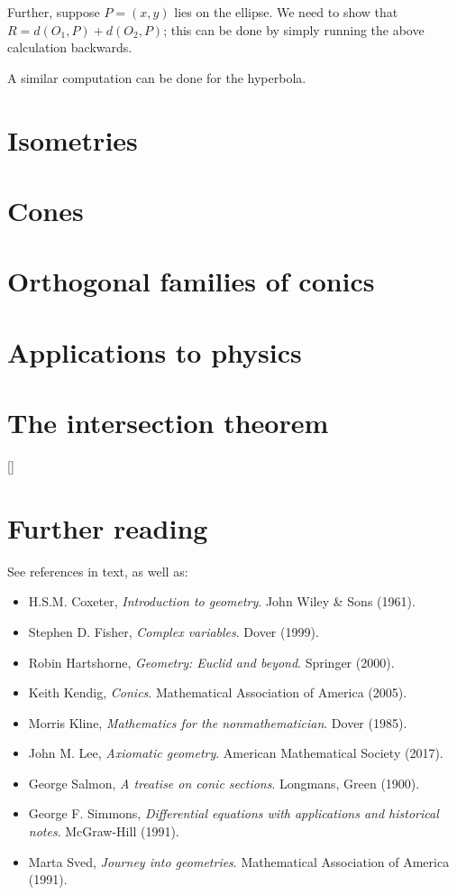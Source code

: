 \documentclass[a4paper,leqno,10pt]{article}
\theoremstyle{exercise}
\theoremstyle{plain}
\theoremstyle{definition}
\theoremstyle{remark}
\begin{document}
Further, suppose $ P = (x,y) $ lies on the ellipse. We need to show that $ R = d(O_1, P) + d(O_2, P) $; this can be done by simply running
the above calculation backwards.

A similar computation can be done for the hyperbola.

\section{Isometries}

\section{Cones}

\section{Orthogonal families of conics}

\section{Applications to physics}

\section{The intersection theorem}

\appendix
{}[{\titlerule[0.8pt]}]
\section{Further reading}
See references in text, as well as:
\begin{itemize}
  \item H.S.M. Coxeter, \emph{Introduction to geometry}. John Wiley \& Sons (1961).
  \item Stephen D. Fisher, \emph{Complex variables}. Dover (1999).
  \item Robin Hartshorne, \emph{Geometry: Euclid and beyond}. Springer (2000).
  \item Keith Kendig, \emph{Conics}. Mathematical Association of America (2005).
  \item Morris Kline, \emph{Mathematics for the nonmathematician}. Dover (1985).
  \item John M. Lee, \emph{Axiomatic geometry}. American Mathematical Society (2017).
  \item George Salmon, \emph{A treatise on conic sections}. Longmans, Green (1900).
  \item George F. Simmons, \emph{Differential equations with applications and historical notes}. McGraw-Hill (1991).
  \item Marta Sved, \emph{Journey into geometries}. Mathematical Association of America (1991).
\end{itemize}
\end{document}
